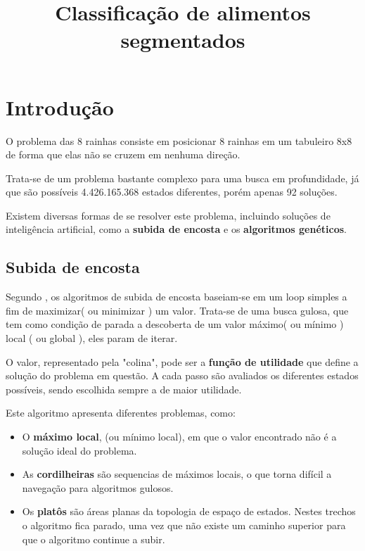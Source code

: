 \documentclass[conference]{IEEEtran}
\begin{document}
\title{Classificação de alimentos segmentados}

\author{
 }

\maketitle


\section{Introdução}
\IEEEPARstart
O problema das 8 rainhas consiste em posicionar 8 rainhas em um tabuleiro 
8x8 de forma que elas não se cruzem em nenhuma direção.

Trata-se de um problema bastante complexo para uma busca em profundidade, 
já que são possíveis 4.426.165.368 estados diferentes, porém apenas 92 soluções. \cite{wiki8queen}

Existem diversas formas de se resolver este problema, incluindo soluções de inteligência artificial,
 como a \textbf{subida de encosta} e os \textbf{algoritmos genéticos}.
\subsection{Subida de encosta}
Segundo \cite{norvig2014inteligencia}, os algoritmos de subida de encosta baseiam-se em um loop simples
a fim de maximizar( ou minimizar ) um valor. Trata-se de uma busca gulosa, que tem como condição de parada 
a descoberta de um valor máximo( ou mínimo ) local ( ou global ), eles param de iterar.

O valor, representado pela "colina", pode ser a \textbf{função de utilidade} que define a solução do
problema em questão. A cada passo são avaliados os diferentes estados possíveis, sendo escolhida sempre a de maior utilidade.

Este algoritmo apresenta diferentes problemas, como:


\begin{itemize}
	\item O \textbf{máximo local}, (ou mínimo local), em que o valor encontrado não é
	a solução ideal do problema. 
	\item As \textbf{cordilheiras} são sequencias de máximos locais, o que torna difícil a navegação 
	para algoritmos gulosos.
	\item Os \textbf{platôs} são áreas planas da topologia de espaço de estados. Nestes trechos o algoritmo fica parado, uma vez que não existe um caminho superior para que o algoritmo continue a subir.
\end{itemize} 
\end{document}
